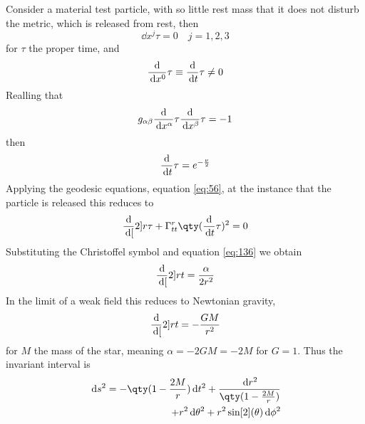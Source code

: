Consider a material test particle, with so little rest mass that it
does not disturb the metric, which is released from rest, then
\begin{equation}
  \label{eq:134}
  \dd{x^j}{\tau} = 0 \quad j = 1,2,3
\end{equation}
for $\tau$ the proper time, and
\begin{equation}
  \label{eq:135}
  \frac{\mathrm{d}}{\,\mathrm{d} x^0}{\tau} \equiv \frac{\mathrm{d}}{\,\mathrm{d} t}{\tau} \neq 0
\end{equation}
Realling that 
\[ g_{\alpha\beta} \frac{\mathrm{d}}{\,\mathrm{d} x^{\alpha}}{\tau} \frac{\mathrm{d}}{\,\mathrm{d} x^{\beta}}{\tau} = -1 \]
then
\begin{equation}
  \label{eq:136}
  \frac{\mathrm{d}}{\,\mathrm{d} t}{\tau} = e^{- \frac{\nu}{2}}
\end{equation}
Applying the geodesic equations, equation \eqref{eq:56}, at the
instance that the particle is released this reduces to
\begin{equation}
  \label{eq:137}
  \dv[2]{r}{\tau} + \Gamma_{tt}^r \qty( \dv{t}{\tau})^2 =0
\end{equation}
Substituting the Christoffel symbol and equation \eqref{eq:136} we
obtain
\begin{equation}
  \label{eq:138}
  \frac{\mathrm{d}}{\,\mathrm{d} [}2]{r}{t} = \frac{\alpha}{2 r^2}
\end{equation}
In the limit of a weak field this reduces to Newtonian gravity,
\begin{equation}
  \label{eq:139}
  \frac{\mathrm{d}}{\,\mathrm{d} [}2]{r}{t} = - \frac{GM}{r^2}
\end{equation}
for $M$ the mass of the star, meaning $\alpha = -2GM =-2M$ for
$G=1$. Thus the invariant interval is
\begin{equation}
  \label{eq:140}
\begin{split}
  \dd{s^2} = - \qty(1-\frac{2M}{r}) \dd{t^2} + \frac{\dd{r^2}}{\qty(1-\frac{2M}{r})} \\
+ r^2 \dd{\theta^2} + r^2 \sin[2](\theta) \dd{\phi^2}
\end{split}
\end{equation}

